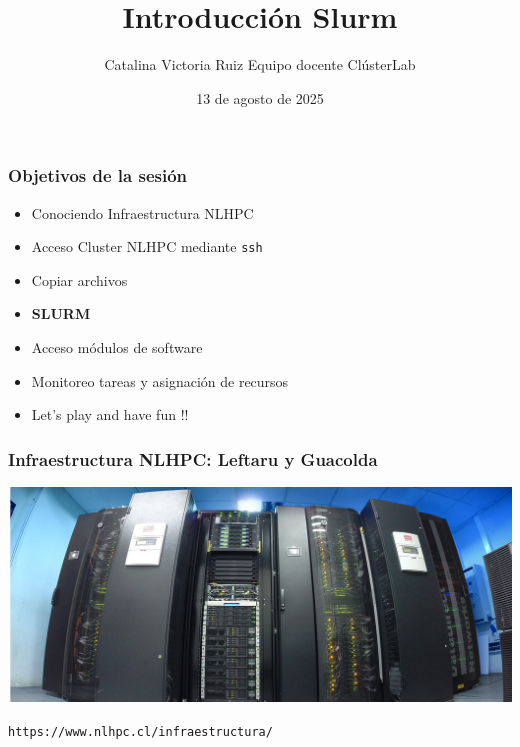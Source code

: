 \documentclass[aspectratio=169,professionalfonts]{beamer}
\title[ClústerLab • Día 5]{Introducción Slurm}
\author{ Catalina Victoria Ruiz Equipo docente ClústerLab}
\date{13 de agosto de 2025}
\begin{document}
\begin{frame}[plain]
  \titlepage
\end{frame}

\begin{frame}[fragile]
\frametitle{\textbf{Objetivos de la sesión}}
  \begin{itemize}
\item Conociendo Infraestructura NLHPC 
         \vspace{0.5em} 
\item Acceso Cluster NLHPC mediante \texttt{ssh}
         \vspace{0.5em} 
\item Copiar archivos 
\vspace{0.5em} 
\item \textbf{SLURM}
\vspace{0.5em} 
\item Acceso módulos de software 
\vspace{0.5em} 
\item Monitoreo tareas y asignación de recursos
\vspace{0.5em} 
\item Let's play and have fun  !! 
\end{itemize}
\end{frame}



\begin{frame}[fragile]
\frametitle{\textbf{Infraestructura NLHPC: Leftaru y Guacolda}}
    \centering
    \includegraphics[scale=0.3]{FIGURES/NLHPC.png}
    
    \vspace{0.5em}
    {\color{blue} \scriptsize \texttt{https://www.nlhpc.cl/infraestructura/}}
\end{frame}
\end{document}
